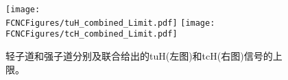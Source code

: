 \begin{figure}[H]
\centering
\texttt{[image: \\FCNCFigures/tuH\_combined\_Limit.pdf]}
\texttt{[image: \\FCNCFigures/tcH\_combined\_Limit.pdf]}
\caption{轻子道和强子道分别及联合给出的tuH(左图)和tcH(右图)信号的上限。 }
\label{fig:combined_limit}
\end{figure}
